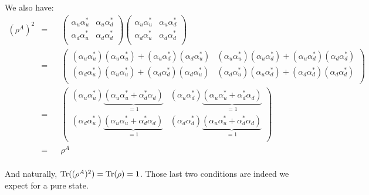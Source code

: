 \documentclass[solutions.tex]{subfiles}
\begin{document}
We also have:
\begin{equation*}\begin{aligned}
	(\rho^A)^2 &=&&  \begin{pmatrix}
		\alpha_u\alpha_u^* & \alpha_u\alpha_d^* \\
		\alpha_d\alpha_u^* & \alpha_d\alpha_d^* \\
	\end{pmatrix} \begin{pmatrix}
		\alpha_u\alpha_u^* & \alpha_u\alpha_d^* \\
		\alpha_d\alpha_u^* & \alpha_d\alpha_d^* \\
	\end{pmatrix} \\
	~ &=&& \begin{pmatrix}
		(\alpha_u\alpha_u^*)(\alpha_u\alpha_u^*)
		+(\alpha_u\alpha_d^*)(\alpha_d\alpha_u^*)
		&
		(\alpha_u\alpha_u^*)(\alpha_u\alpha_d^*)
		+ (\alpha_u\alpha_d^*)(\alpha_d\alpha_d^*)
		\\
		(\alpha_d\alpha_u^*)(\alpha_u\alpha_u^*)
		+(\alpha_d\alpha_d^*)(\alpha_d\alpha_u^*)
		&
		(\alpha_d\alpha_u^*)(\alpha_u\alpha_d^*)
		+(\alpha_d\alpha_d^*)(\alpha_d\alpha_d^*)
		\\
	\end{pmatrix} \\
	~ &=&& \begin{pmatrix}
		(\alpha_u\alpha_u^*)\underbrace{
			(\alpha_u\alpha_u^* + \alpha_d^*\alpha_d)
		}_{=1}
		&
		(\alpha_u\alpha_d^*)\underbrace{
			(\alpha_u\alpha_u^* + \alpha_d^*\alpha_d)
		}_{=1}
		\\
		(\alpha_d\alpha_u^*)\underbrace{
			(\alpha_u\alpha_u^* + \alpha_d^*\alpha_d)
		}_{=1}
		&
		(\alpha_d\alpha_d^*)\underbrace{
			(\alpha_u\alpha_u^* + \alpha_d^*\alpha_d)
		}_{=1}
		\\
	\end{pmatrix} \\
	~ &=&& \rho^A \\
\end{aligned}\end{equation*}

And naturally, $\text{Tr}((\rho^A)^2) = \text{Tr}(\rho) = 1$. Those last two conditions
are indeed we expect for a pure state. \\
\end{document}
